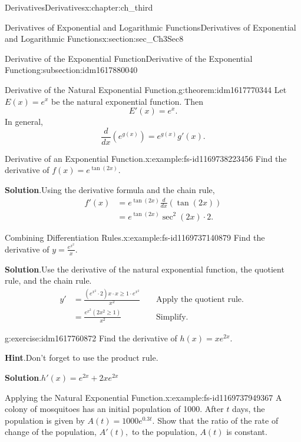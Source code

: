 \documentclass[oneside,10pt,]{book}
\newcommand{\blocktitlefont}{\relax}
\numberwithin{equation}{section}
\newcommand{\amp}{&}
\begin{document}
\begin{chapterptx}{Derivatives}{}{Derivatives}{}{}{x:chapter:ch_third}
\begin{sectionptx}{Derivatives of Exponential and Logarithmic Functions}{}{Derivatives of Exponential and Logarithmic Functions}{}{}{x:section:sec_Ch3Sec8}
\begin{subsectionptx}{Derivative of the Exponential Function}{}{Derivative of the Exponential Function}{}{}{g:subsection:idm1617880040}
\begin{theorem}{Derivative of the Natural Exponential Function.}{}{g:theorem:idm1617770344}
Let \(E(x)=e^x\) be the natural exponential function. Then%
%
\begin{equation*}
E'(x)=e^x.
\end{equation*}
In general,%
%
\begin{equation*}
\frac{d}{dx}(e^{g(x)})=e^{g(x)}g'(x).
\end{equation*}
\end{theorem}
\begin{example}{Derivative of an Exponential Function.}{x:example:fs-id1169738223456}%
Find the derivative of \(f(x)=e^{\tan (2x)}.\)%
\par\smallskip%
\noindent\textbf{\blocktitlefont Solution}.\hypertarget{g:solution:idm1617762920}{}\quad{}Using the derivative formula and the chain rule,%
%
\begin{align*}
f'(x)\amp=e^{\tan (2x)}\frac{d}{dx}(\tan  (2x))\\
\amp=e^{\tan (2x)}\sec^2(2x)\cdot 2.
\end{align*}
\end{example}
\begin{example}{Combining Differentiation Rules.}{x:example:fs-id1169737140879}%
Find the derivative of \(y=\frac{e^{x^2}}{x}.\)%
\par\smallskip%
\noindent\textbf{\blocktitlefont Solution}.\hypertarget{g:solution:idm1617763816}{}\quad{}Use the derivative of the natural exponential function, the quotient rule, and the chain rule.%
%
\begin{align*}
y'\amp=\frac{(e^{x^2}\cdot 2)x\cdot x\geq 1\cdot e^{x^2}}{x^2}\amp \amp\text{ Apply the quotient rule. }\\
\amp =\frac{e^{x^2}(2x^2\geq 1)}{x^2}\amp \amp\text{ Simplify. }
\end{align*}
\end{example}
\begin{inlineexercise}{}{g:exercise:idm1617760872}%
Find the derivative of \(h(x)=xe^{2x}.\)%
\par\smallskip%
\noindent\textbf{\blocktitlefont Hint}.\hypertarget{g:hint:idm1617761128}{}\quad{}Don’t forget to use the product rule.%
\par\smallskip%
\noindent\textbf{\blocktitlefont Solution}.\hypertarget{g:solution:idm1617759720}{}\quad{}\(h'(x)=e^{2x}+2xe^{2x}\)%
\end{inlineexercise}%
\begin{example}{Applying the Natural Exponential Function.}{x:example:fs-id1169737949367}%
A colony of mosquitoes has an initial population of 1000. After \(t\) days, the population is given by \(A(t)=1000e^{0.3t}.\) Show that the ratio of the rate of change of the population, \(A'(t),\) to the population, \(A(t)\) is constant.%

\end{example}
\end{subsectionptx}
\end{sectionptx}
\end{chapterptx}
\end{document}

